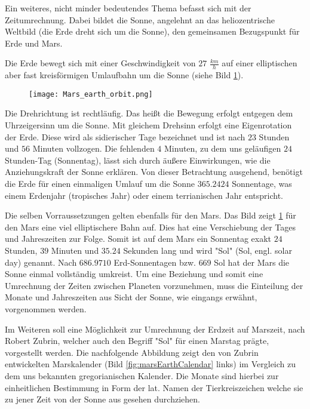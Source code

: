 Ein weiteres, nicht minder bedeutendes Thema befasst sich mit der
Zeitumrechnung. Dabei bildet die Sonne, angelehnt an das heliozentrische
Weltbild (die Erde dreht sich um die Sonne), den gemeinsamen Bezugspunkt für
Erde und Mars.

Die Erde bewegt sich mit einer Geschwindigkeit von $27$ $\frac{km}{h}$ auf einer
elliptischen aber fast kreisförmigen Umlaufbahn um die Sonne (siehe Bild
\ref{fig:marsEarthOrbit}).

\begin{figure}[H]
	\centering
	\texttt{[image: Mars\_earth\_orbit.png]}
	\label{fig:marsEarthOrbit}
\end{figure}

Die Drehrichtung ist rechtläufig. Das heißt die Bewegung erfolgt entgegen dem
Uhrzeigersinn um die Sonne. Mit gleichem Drehsinn erfolgt eine Eigenrotation
der Erde. Diese wird als sidierischer Tage bezeichnet und ist nach $23$ Stunden
und $56$ Minuten vollzogen. Die fehlenden $4$ Minuten, zu dem uns geläufigen
$24$ Stunden-Tag (Sonnentag), lässt sich durch äußere Einwirkungen, wie die
Anziehungskraft der Sonne erklären. Von dieser Betrachtung ausgehend, benötigt
die Erde für einen einmaligen Umlauf um die Sonne $365.2424$ Sonnentage, was
einem Erdenjahr (tropisches Jahr) oder einem terrianischen Jahr entspricht. 

Die selben Vorraussetzungen gelten ebenfalls für den Mars. Das Bild zeigt
\ref{fig:marsEarthOrbit} für den Mars eine viel elliptischere Bahn auf. Dies hat
eine Verschiebung der Tages und Jahreszeiten zur Folge. Somit ist auf dem Mars
ein Sonnentag exakt $24$ Stunden, $39$ Minuten und $35.24$ Sekunden lang und
wird "Sol" (Sol, engl. solar day) genannt. Nach $686.9710$ Erd-Sonnentagen bzw.
$669$ Sol hat der Mars die Sonne einmal vollständig umkreist. Um eine Beziehung
und somit eine Umrechnung der Zeiten zwischen Planeten vorzunehmen, muss die
Einteilung der Monate und Jahreszeiten aus Sicht der Sonne, wie eingangs
erwähnt, vorgenommen werden. 

Im Weiteren soll eine Möglichkeit zur Umrechnung der Erdzeit auf Marszeit, nach
Robert Zubrin,  welcher auch den Begriff "Sol" für einen Marstag prägte,
vorgestellt werden. Die nachfolgende Abbildung zeigt den von Zubrin entwickelten
Marskalender (Bild \ref{fig:marsEarthCalendar} links) im Vergleich zu dem uns
bekannten gregorianischen Kalender. Die Monate sind hierbei zur einheitlichen
Bestimmung in Form der lat. Namen der Tierkreiszeichen welche sie zu jener Zeit
von der Sonne aus gesehen durchziehen.

